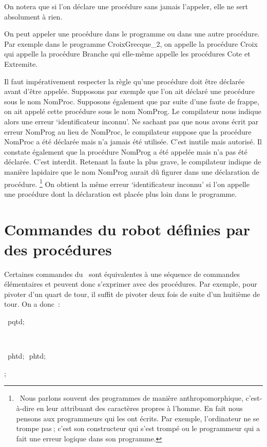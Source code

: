 On notera que si l'on déclare une procédure sans jamais l'appeler, elle 
ne sert absolument à rien. 

On peut appeler une procédure dans le programme ou dans une autre procédure.
Par exemple dans le programme {\idt CroixGrecque\_2}, on appelle 
la procédure {\idt Croix} qui appelle la procédure {\idt Branche} qui elle-même
appelle les procédures {\idt Cote} et {\idt Extremite}. 

Il faut impérativement respecter la règle qu'une procédure doit 
être
dé\-cla\-rée avant d'être ap\-pe\-lée. Supposons par exemple que l'on ait
déclaré une pro\-cé\-du\-re sous le nom {\idt NomProc}. Supposons également
que par suite d'une faute de frappe, on ait appelé cette procédure
sous le nom {\idt NomProg}. Le compilateur nous indique alors une erreur
`identificateur inconnu'. Ne sachant pas que nous avons écrit par erreur 
{\idt NomProg} au lieu de {\idt NomProc}, le compilateur suppose que la 
procédure {\idt NomProc} a été déclarée mais n'a jamais été utilisée.
C'est inutile mais autorisé. Il constate également que la procédure
{\idt NomProg} a été appelée mais n'a pas été déclarée. C'est interdit.
Retenant la faute la plus grave, le compilateur indique de manière
lapidaire que le nom {\idt NomProg} aurait
dû figurer dans une déclaration de procédure.%
\footnote{\ Nous parlons souvent des programmes de manière 
anthropomorphique, c'est-à-dire en leur attribuant des caractères 
propres à l'homme. En fait nous pensons aux programmeurs qui les
ont écrits. Par exemple, l'ordinateur ne se trompe pas$\:$; c'est son 
constructeur qui s'est trompé ou le programmeur qui a fait une erreur 
logique dans son programme.} 
On obtient la même erreur `identificateur inconnu' si l'on appelle une procédure
dont la déclaration est placée plus loin dans le programme.

\section{Commandes du robot définies par des procédures} 

Certaines commandes du \robot\ sont équivalentes à une séquence
de commandes élémentaires et peuvent donc s'exprimer avec des procédures.
Par exemple, pour pivoter d'un quart de tour, il suffit de pivoter deux fois
de suite d'un huitième de tour. On a donc~:
\medskip

\pagebreak[3] 
\vspace{\neglskip}\mbox{\blc  {}\ pqtd$;$}\par 
\vspace{\neglskip}\mbox{\blc  \ }\par 
\vspace{\neglskip}\mbox{\blc  {}}\par 
\vspace{\neglskip}\mbox{\blc  \ \idt  phtd$;$\ phtd$;$\ }\par 
\vspace{\neglskip}\mbox{\blc  {}$;$}\par 
\medskip

